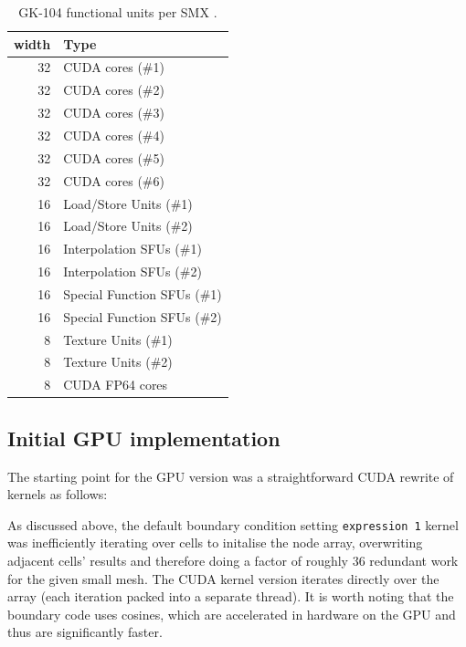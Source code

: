 \documentclass[11pt, oneside, a4paper]{article}
\begin{document}
\begin{table}[tb]
	\caption{GK-104 functional units per SMX \cite{Anand}.}
	\label{tab:funcunits}
	\begin{center}
		\begin{tabular}{rl}
		\hline

		\hline
		\textbf{width} & \textbf{Type} \\
		\hline
			32 & CUDA cores (\#1) \\
			32 & CUDA cores (\#2) \\
			32 & CUDA cores (\#3) \\
			32 & CUDA cores (\#4) \\
			32 & CUDA cores (\#5) \\
			32 & CUDA cores (\#6) \\
			16 & Load/Store Units (\#1) \\
			16 & Load/Store Units (\#2) \\
			16 & Interpolation SFUs (\#1) \\
			16 & Interpolation SFUs (\#2) \\
			16 & Special Function SFUs (\#1) \\
			16 & Special Function SFUs (\#2) \\
			8 & Texture Units (\#1) \\
			8 & Texture Units (\#2) \\
			8 & CUDA FP64 cores \\
		\hline

		\hline
		\end{tabular}
	\end{center}
\end{table}


\subsection{Initial GPU implementation} %
\label{sub:initial_implementation}
The starting point for the GPU version was a straightforward CUDA rewrite of kernels as follows:

As discussed above, the default boundary condition setting \texttt{expression 1} kernel was inefficiently iterating over cells to initalise the node array, overwriting adjacent cells' results and therefore doing a factor of roughly 36 redundant work for the given small mesh. The CUDA kernel version iterates directly over the array (each iteration packed into a separate thread). It is worth noting that the boundary code uses cosines, which are accelerated in hardware on the GPU and thus are significantly faster.
\end{document}

